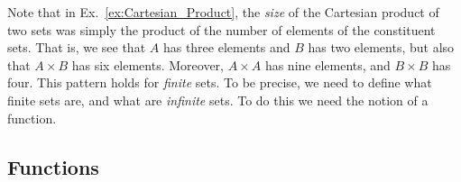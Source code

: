                Note that in Ex.~\ref{ex:Cartesian_Product}, the
                \textit{size} of the Cartesian product of two sets
                was simply the product of the number of elements of
                the constituent sets. That is, we see that $A$ has
                three elements and $B$ has two elements, but also
                that $A\times{B}$ has six elements. Moreover,
                $A\times{A}$ has nine elements, and $B\times{B}$ has
                four. This pattern holds for \textit{finite} sets.
                To be precise, we need to define what finite sets
                are, and what are \textit{infinite} sets. To do
                this we need the notion of a function.
        \subsection{Functions}
